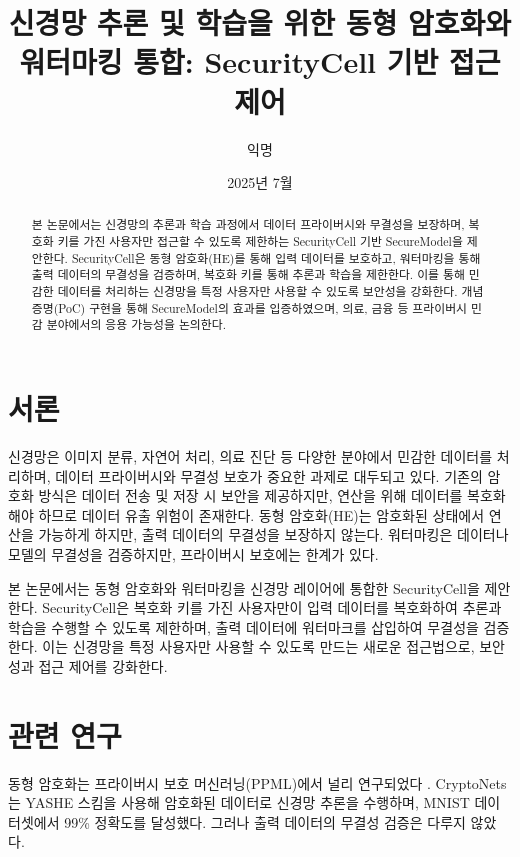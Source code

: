 \documentclass[11pt]{article}
\begin{document}
\title{신경망 추론 및 학습을 위한 동형 암호화와 워터마킹 통합: SecurityCell 기반 접근 제어}
\author{익명}
\date{2025년 7월}
\maketitle

\begin{abstract}
본 논문에서는 신경망의 추론과 학습 과정에서 데이터 프라이버시와 무결성을 보장하며, 복호화 키를 가진 사용자만 접근할 수 있도록 제한하는 SecurityCell 기반 SecureModel을 제안한다. SecurityCell은 동형 암호화(HE)를 통해 입력 데이터를 보호하고, 워터마킹을 통해 출력 데이터의 무결성을 검증하며, 복호화 키를 통해 추론과 학습을 제한한다. 이를 통해 민감한 데이터를 처리하는 신경망을 특정 사용자만 사용할 수 있도록 보안성을 강화한다. 개념 증명(PoC) 구현을 통해 SecureModel의 효과를 입증하였으며, 의료, 금융 등 프라이버시 민감 분야에서의 응용 가능성을 논의한다.
\end{abstract}

\section{서론}
신경망은 이미지 분류, 자연어 처리, 의료 진단 등 다양한 분야에서 민감한 데이터를 처리하며, 데이터 프라이버시와 무결성 보호가 중요한 과제로 대두되고 있다. 기존의 암호화 방식은 데이터 전송 및 저장 시 보안을 제공하지만, 연산을 위해 데이터를 복호화해야 하므로 데이터 유출 위험이 존재한다. 동형 암호화(HE)는 암호화된 상태에서 연산을 가능하게 하지만, 출력 데이터의 무결성을 보장하지 않는다. 워터마킹은 데이터나 모델의 무결성을 검증하지만, 프라이버시 보호에는 한계가 있다.

본 논문에서는 동형 암호화와 워터마킹을 신경망 레이어에 통합한 SecurityCell을 제안한다. SecurityCell은 복호화 키를 가진 사용자만이 입력 데이터를 복호화하여 추론과 학습을 수행할 수 있도록 제한하며, 출력 데이터에 워터마크를 삽입하여 무결성을 검증한다. 이는 신경망을 특정 사용자만 사용할 수 있도록 만드는 새로운 접근법으로, 보안성과 접근 제어를 강화한다.

\section{관련 연구}
동형 암호화는 프라이버시 보호 머신러닝(PPML)에서 널리 연구되었다 \citep{dowlin2016cryptonets, zhang2021privacy, chillotti2020faster}. CryptoNets \citep{dowlin2016cryptonets}는 YASHE 스킴을 사용해 암호화된 데이터로 신경망 추론을 수행하며, MNIST 데이터셋에서 99\% 정확도를 달성했다. 그러나 출력 데이터의 무결성 검증은 다루지 않았다.
\end{document}
